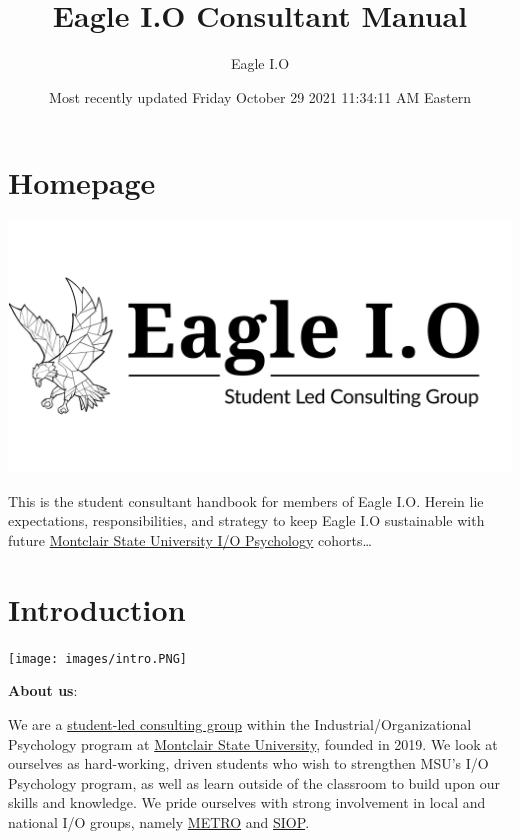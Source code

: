 \documentclass[
]{book}
\title{Eagle I.O Consultant Manual}
\author{Eagle I.O}
\date{Most recently updated Friday October 29 2021 11:34:11 AM Eastern}
\begin{document}
\maketitle

{
\setcounter{tocdepth}{4}
\tableofcontents
}
\hypertarget{homepage}{%
\chapter*{Homepage}\label{homepage}}

\includegraphics{images/eagleio dot.jpg}

This is the student consultant handbook for members of Eagle I.O. Herein lie expectations, responsibilities, and strategy to keep Eagle I.O sustainable with future \href{https://www.montclair.edu/psychology/graduate-programs/industrial-organizational-psychology/}{Montclair State University I/O Psychology} cohorts\ldots{}

\hypertarget{introduction}{%
\chapter{Introduction}\label{introduction}}

\texttt{[image: images/intro.PNG]}

\textbf{About us}:

We are a \href{https://eagle-io.weebly.com/}{student-led consulting group} within the Industrial/Organizational Psychology program at \href{https://www.montclair.edu/psychology/graduate-programs/industrial-organizational-psychology/}{Montclair State University}, founded in 2019. We look at ourselves as hard-working, driven students who wish to strengthen MSU's I/O Psychology program, as well as learn outside of the classroom to build upon our skills and knowledge. We pride ourselves with strong involvement in local and national I/O groups, namely \href{https://metroapppsych.com/}{METRO} and \href{https://siop.org}{SIOP}.
\end{document}
